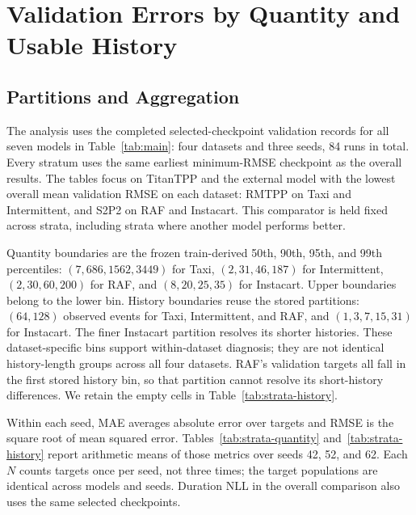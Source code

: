 \section{Validation Errors by Quantity and Usable History}\label{app:strata}
\subsection{Partitions and Aggregation}
The analysis uses the completed selected-checkpoint validation records for
all seven models in Table~\ref{tab:main}: four datasets and three seeds,
84 runs in total. Every stratum uses the same earliest minimum-RMSE
checkpoint as the overall results. The tables focus on TitanTPP and the
external model with the lowest overall mean validation RMSE on each dataset:
RMTPP on Taxi and Intermittent, and S2P2 on RAF and Instacart. This comparator
is held fixed across strata, including strata where another model performs
better.

Quantity boundaries are the frozen train-derived 50th, 90th, 95th, and
99th percentiles: $(7,686,1562,3449)$ for Taxi, $(2,31,46,187)$ for
Intermittent, $(2,30,60,200)$ for RAF, and $(8,20,25,35)$ for Instacart.
Upper boundaries belong to the lower bin. History boundaries reuse the
stored partitions: $(64,128)$ observed events for Taxi, Intermittent, and
RAF, and $(1,3,7,15,31)$ for Instacart. The finer Instacart partition
resolves its shorter histories. These dataset-specific bins support
within-dataset diagnosis; they are not identical history-length groups
across all four datasets. RAF's validation targets all fall in the first
stored history bin, so that partition cannot resolve its short-history
differences. We retain the empty cells in Table~\ref{tab:strata-history}.

Within each seed, MAE averages absolute error over targets and RMSE is the
square root of mean squared error. Tables~\ref{tab:strata-quantity}
and~\ref{tab:strata-history} report arithmetic means of those metrics over
seeds 42, 52, and 62. Each $N$ counts targets once per seed, not three times;
the target populations are identical across models and seeds. Duration NLL
in the overall comparison also uses the same selected checkpoints.

